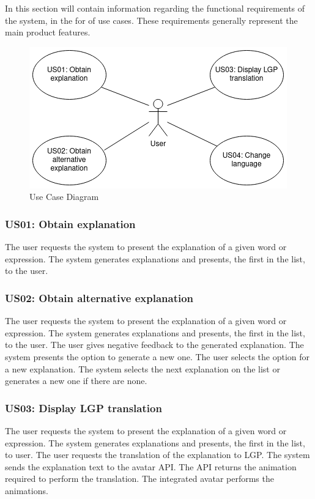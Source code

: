 In this section will contain information regarding the functional requirements of the system, in the for of use cases.
These requirements generally represent the main product features.

\begin{figure}[H]
\centering
\includegraphics[scale=0.65]{ch3/assets/usecasediagram.png}
\caption[Use Case Diagram]{Use Case Diagram}
\label{fig:ucDiagram}
\end{figure}

\subsubsection{US01: Obtain explanation}

The user requests the system to present the explanation of a given word or expression.
The system generates explanations and presents, the first in the list, to the user.

\subsubsection{US02: Obtain alternative explanation}

The user requests the system to present the explanation of a given word or expression.
The system generates explanations and presents, the first in the list, to the user.
The user gives negative feedback to the generated explanation.
The system presents the option to generate a new one.
The user selects the option for a new explanation.
The system selects the next explanation on the list or generates a new one if there are none.

\subsubsection{US03: Display LGP translation}

The user requests the system to present the explanation of a given word or expression.
The system generates explanations and presents, the first in the list, to user.
The user requests the translation of the explanation to \gls{LGP}.
The system sends the explanation text to the avatar API.
The API returns the animation required to perform the translation.
The integrated avatar performs the animations.

